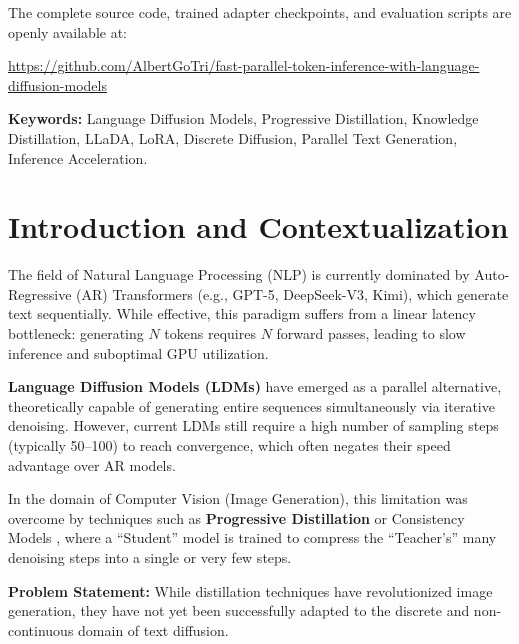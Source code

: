 \documentclass[11pt, a4paper]{article}
\begin{document}
\vspace{0.5cm}
\noindent The complete source code, trained adapter checkpoints, and evaluation scripts are openly available at:
\begin{center}
    \url{https://github.com/AlbertGoTri/fast-parallel-token-inference-with-language-diffusion-models}
\end{center}

\vspace{0.5cm}
\noindent \textbf{Keywords:} Language Diffusion Models, Progressive Distillation, Knowledge Distillation, LLaDA, LoRA, Discrete Diffusion, Parallel Text Generation, Inference Acceleration.

\newpage

\section{Introduction and Contextualization}
\label{sec:intro_context}

The field of Natural Language Processing (NLP) is currently dominated by Auto-Regressive (AR) Transformers (e.g., GPT-5, DeepSeek-V3, Kimi), which generate text sequentially. While effective, this paradigm suffers from a linear latency bottleneck: generating $N$ tokens requires $N$ forward passes, leading to slow inference and suboptimal GPU utilization.

\textbf{Language Diffusion Models (LDMs)} \cite{nie2025llada} have emerged as a parallel alternative, theoretically capable of generating entire sequences simultaneously via iterative denoising. However, current LDMs still require a high number of sampling steps (typically 50--100) to reach convergence, which often negates their speed advantage over AR models.

In the domain of Computer Vision (Image Generation), this limitation was overcome by techniques such as \textbf{Progressive Distillation} \cite{salimans2022progressive} or Consistency Models \cite{song2023consistency}, where a ``Student'' model is trained to compress the ``Teacher's'' many denoising steps into a single or very few steps.

\textbf{Problem Statement:} While distillation techniques have revolutionized image generation, they have not yet been successfully adapted to the discrete and non-continuous domain of text diffusion.
\end{document}
